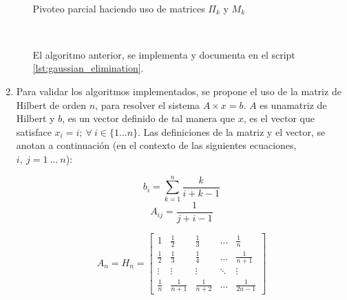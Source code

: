 \documentclass[11pt, spanish]{article}
\begin{document}
\begin{enumerate}
\begin{itemize}
\begin{algorithm}[H]
 \
 \caption{Pivoteo parcial haciendo uso de matrices $\Pi_k$ y $M_k$}
\end{algorithm}\


El algoritmo anterior, se implementa y documenta en el script \ref{lst:gaussian_elimination}.

\end{itemize}

\item Para validar los algoritmos implementados, se propone el uso de la matriz de Hilbert de orden $n$, para resolver el sistema $A \times x = b$. $A$ es unamatriz de Hilbert y $b$, es un vector definido de tal manera que $x$, es el vector que satisface $x_i = i;\ \forall\ i \in \{1 \dots n\}$. Las definiciones de la matriz y el vector, se anotan a continuación (en el contexto de las siguientes ecuaciones, $i,\ j = 1\ \dots\ n$):

\begin{multicols}{2}
  $$
  b_{i} = \sum_{k = 1}^{n} \frac{k}{i + k - 1}
$$\break
$$  
  A_{ij} = \frac{1}{j + i - 1}
$$   
\end{multicols}

$$A_n = H_n = \begin{bmatrix}
    1 & \frac{1}{2} & \frac{1}{3} & \dots  & \frac{1}{n} \\
    \frac{1}{2} & \frac{1}{3} & \frac{1}{4} & \dots  & \frac{1}{n + 1} \\
    \vdots & \vdots & \vdots & \ddots & \vdots \\
    \frac{1}{n} & \frac{1}{n+1} & \frac{1}{n+2} & \dots  & \frac{1}{2n - 1}
\end{bmatrix}$$\


\end{enumerate}
\end{document}
